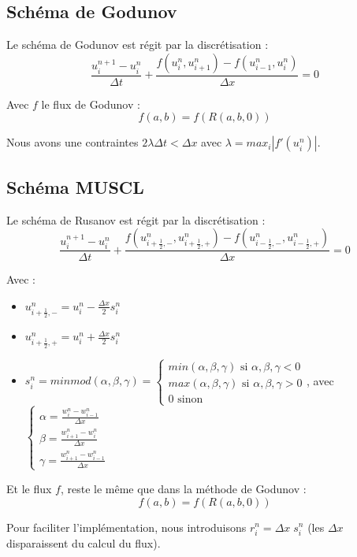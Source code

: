 \documentclass{article}
\begin{document}
\subsection{Schéma de Godunov}

Le schéma de Godunov est régit par la discrétisation :
\[ \frac{u_i^{n+1}-u_i^n}{\Delta t} + \frac{f(u_i^n,u_{i+1}^n) - f(u_{i-1}^n,u_i^n)}{\Delta x} = 0 \]

Avec $f$ le flux de Godunov :
\[f(a,b) = f(R(a,b,0))\]

Nous avons une contraintes $2\lambda \Delta t < \Delta x$ avec $\lambda = max_i |f'(u_i^n)|$.

\subsection{Schéma MUSCL}

Le schéma de Rusanov est régit par la discrétisation :
\[ \frac{u_i^{n+1}-u_i^n}{\Delta t} + \frac{f(u_{i+\frac{1}{2},-}^n,u_{i+\frac{1}{2},+}^n) - f(u_{i-\frac{1}{2},-}^n,u_{i-\frac{1}{2},+}^n)}{\Delta x} = 0 \]

Avec :
\begin{itemize}
	\item $u_{i+\frac{1}{2},-}^n = u_i^n - \frac{\Delta x}{2} s_i^n$
	\item $u_{i+\frac{1}{2},+}^n = u_i^n + \frac{\Delta x}{2} s_i^n$
	\item $s_i^n = minmod(\alpha, \beta, \gamma) = \left\{ \begin{matrix} min(\alpha, \beta, \gamma) \text{ si } \alpha, \beta, \gamma < 0 \\ max(\alpha, \beta, \gamma) \text{ si } \alpha, \beta, \gamma > 0 \\ 0 \text{ sinon} \end{matrix} \right.$, avec $\left\{ \begin{matrix} \alpha = \frac{w_i^n - w_{i-1}^n}{\Delta x} \\ \beta = \frac{w_{i+1}^n - w_i^n}{\Delta x} \\ \gamma = \frac{w_{i+1}^n - w_{i-1}^n}{\Delta x} \end{matrix} \right.$
\end{itemize}

Et le flux $f$, reste le même que dans la méthode de Godunov :
\[f(a,b) = f(R(a,b,0))\]

Pour faciliter l'implémentation, nous introduisons $r_i^n = \Delta x \; s_i^n$ (les $\Delta x$ disparaissent du calcul du flux).
\end{document}
